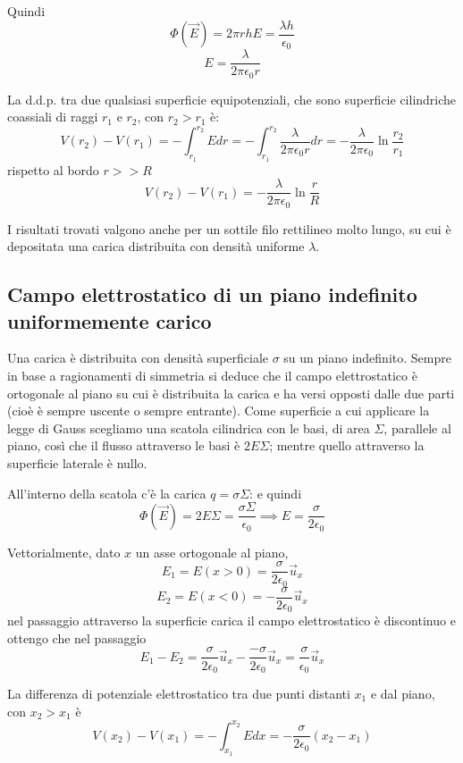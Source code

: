 \documentclass[class=book, crop=false, oneside, 12pt]{standalone}
\begin{document}
Quindi
\begin{equation*}
    \Phi(\overrightarrow{E}) = 2 \pi r h E = \frac{\lambda h}{\epsilon_0} 
\end{equation*}
\begin{equation*}
    E = \frac{\lambda}{2 \pi \epsilon_0 r}
\end{equation*}

La d.d.p. tra due qualsiasi superficie equipotenziali, che sono superficie cilindriche coassiali di raggi \(r_1\) e \(r_2\), con \(r_2 > r_1\) è: 
\begin{equation*}
    V(r_2) - V(r_1) = - \int_{r_1}^{r_2} E d r = - \int_{r_1}^{r_2} \frac{\lambda}{2 \pi \epsilon_0 r} d r = - \frac{\lambda}{2 \pi \epsilon_0} \ln \frac{r_2}{r_1}
\end{equation*}
rispetto al bordo \(r >> R\)
\begin{equation*}
    V(r_2) - V(r_1) = - \frac{\lambda}{2 \pi \epsilon_0} \ln \frac{r}{R}
\end{equation*}

I risultati trovati valgono anche per un sottile filo rettilineo molto lungo, su cui è depositata una carica distribuita con densità uniforme \(\lambda\).

\subsection{Campo elettrostatico di un piano indefinito uniformemente carico}

Una carica è distribuita con densità superficiale \(\sigma\) su un piano indefinito.  
Sempre in base a ragionamenti di simmetria si deduce che il campo elettrostatico è ortogonale al piano su cui è distribuita la carica e ha versi opposti dalle due parti (cioè è sempre uscente o sempre entrante).
Come superficie a cui applicare la legge di Gauss scegliamo una scatola cilindrica con le basi, di area \(\Sigma\), parallele al piano, così che il flusso attraverso le basi è \(2 E \Sigma\); mentre quello attraverso la superficie laterale è nullo.

All'interno della scatola c'è la carica \(q = \sigma \Sigma\): e quindi
\begin{equation*}
    \Phi(\overrightarrow{E}) = 2 E \Sigma = \frac{\sigma \Sigma}{\epsilon_0} \implies E = \frac{\sigma}{2 \epsilon_0}
\end{equation*}

Vettorialmente, dato \(x\) un asse ortogonale al piano,
\begin{equation*}
    E_1 = E(x > 0 ) = \frac{\sigma}{2 \epsilon_0} \overrightarrow{u}_x
\end{equation*}
\begin{equation*}
    E_2 = E(x < 0 ) = - \frac{\sigma}{2 \epsilon_0} \overrightarrow{u}_x
\end{equation*}
nel passaggio attraverso la superficie carica il campo elettrostatico è discontinuo e ottengo che nel passaggio
\begin{equation*}
    E_1 - E_2 = \frac{\sigma}{2 \epsilon_0} \overrightarrow{u}_x - \frac{- \sigma}{2 \epsilon_0} \overrightarrow{u}_x = \frac{\sigma}{\epsilon_0} \overrightarrow{u}_x
\end{equation*}

La differenza di potenziale elettrostatico tra due punti distanti \(x_1\) e dal piano, con \(x_2 > x_1\) è 
\begin{equation*}
    V(x_2) - V(x_1) = - \int_{x_1}^{x_2} E dx = - \frac{\sigma}{2 \epsilon_0} (x_2 - x_1)
\end{equation*}
\end{document}
